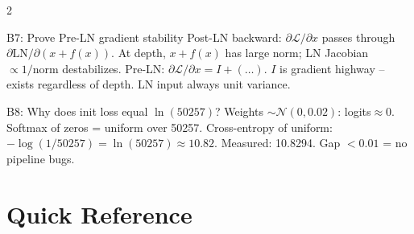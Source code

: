\documentclass[10pt,a4paper]{article}
\begin{document}
\begin{multicols}{2}
\begin{bonusbox}{B7: Prove Pre-LN gradient stability}
Post-LN backward: $\partial\mathcal{L}/\partial x$ passes through $\partial\text{LN}/\partial(x+f(x))$.
At depth, $x+f(x)$ has large norm; LN Jacobian $\propto 1/\text{norm}$ destabilizes.
Pre-LN: $\partial\mathcal{L}/\partial x = I + (\ldots)$.
$I$ is gradient highway -- exists regardless of depth. LN input always unit variance.
\end{bonusbox}

\begin{bonusbox}{B8: Why does init loss equal $\ln(50257)$?}
Weights $\sim\mathcal{N}(0,0.02)$: logits$\approx0$. Softmax of zeros = uniform over 50257.
Cross-entropy of uniform: $-\log(1/50257) = \ln(50257) \approx 10.82$.
Measured: 10.8294. Gap $<0.01$ = no pipeline bugs.
\end{bonusbox}

\end{multicols}

\section{Quick Reference}
\end{document}
